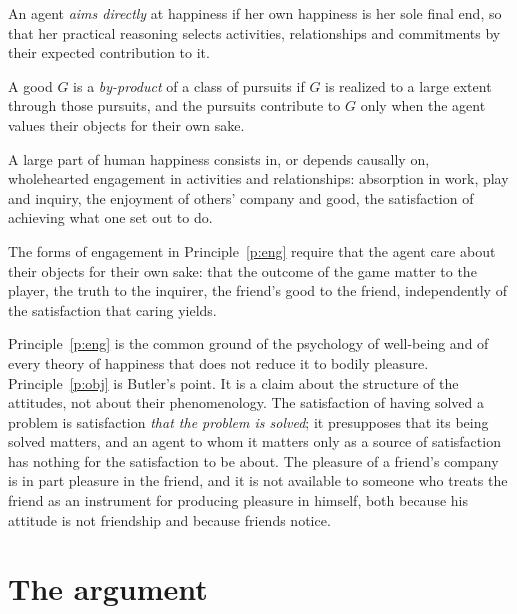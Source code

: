 \documentclass{situationist-preprint}
\begin{document}
\begin{definition}\label{d:direct}
An agent \emph{aims directly} at happiness if her own happiness is her sole final end, so that her practical reasoning selects activities, relationships and commitments by their expected contribution to it.
\end{definition}

\begin{definition}[By-product]\label{d:byprod}
A good $G$ is a \emph{by-product} of a class of pursuits if $G$ is realized to a large extent through those pursuits, and the pursuits contribute to $G$ only when the agent values their objects for their own sake.
\end{definition}

\begin{principle}[Engagement]\label{p:eng}
A large part of human happiness consists in, or depends causally on, wholehearted engagement in activities and relationships: absorption in work, play and inquiry, the enjoyment of others' company and good, the satisfaction of achieving what one set out to do.
\end{principle}

\begin{principle}\label{p:obj}
The forms of engagement in Principle~\ref{p:eng} require that the agent care about their objects for their own sake: that the outcome of the game matter to the player, the truth to the inquirer, the friend's good to the friend, independently of the satisfaction that caring yields.
\end{principle}

Principle~\ref{p:eng} is the common ground of the psychology of well-being and of every theory of happiness that does not reduce it to bodily pleasure. Principle~\ref{p:obj} is Butler's point. It is a claim about the structure of the attitudes, not about their phenomenology. The satisfaction of having solved a problem is satisfaction \emph{that the problem is solved}; it presupposes that its being solved matters, and an agent to whom it matters only as a source of satisfaction has nothing for the satisfaction to be about. The pleasure of a friend's company is in part pleasure in the friend, and it is not available to someone who treats the friend as an instrument for producing pleasure in himself, both because his attitude is not friendship and because friends notice.

\section{The argument}
\end{document}
